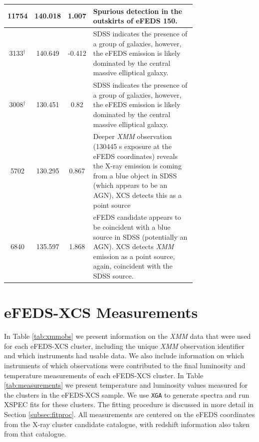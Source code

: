 \documentclass[fleqn,usenatbib]{mnras}
\begin{document}
\begin{table}
\begin{center}
\begin{tabular}{ccc|p{0.75\linewidth}}
\hline
11754 & 140.018 & 1.007 & Spurious detection in the outskirts of eFEDS 150. \\ 
\hline
3133$^\dagger$ & 140.649 & -0.412 & SDSS indicates the presence of a group of galaxies, however, the eFEDS emission is likely dominated by the central massive elliptical galaxy. \\ 
\hline
3008$^\dagger$ & 130.451 & 0.82 & SDSS indicates the presence of a group of galaxies, however, the eFEDS emission is likely dominated by the central massive elliptical galaxy. \\ 
\hline
5702 & 130.295 & 0.867 & Deeper {\em XMM} observation (130445 s exposure at the eFEDS coordinates) reveals the X-ray emission is coming from a blue object in SDSS (which appears to be an AGN), XCS detects this as a point source  \\ 
\hline
6840 & 135.597 & 1.868 & eFEDS candidate appears to be coincident with a blue source in SDSS (potentially an AGN). XCS detects {\em XMM} emission as a point source, again, coincident with the SDSS source. \\ 
\hline
\end{tabular}
\end{center}
\end{table}

\section{\lowercase{e}FEDS-XCS Measurements}
\label{app:measurements}
In Table \ref{tab:xmmobs} we present information on the {\em XMM} data that were used for each eFEDS-XCS cluster, including the unique {\em XMM} observation identifier and which instruments had usable data. We also include information on which instruments of which observations were contributed to the final luminosity and temperature measurements of each eFEDS-XCS cluster. 
In Table \ref{tab:measurements} we present temperature and luminosity values measured for the clusters in the eFEDS-XCS sample. We use \texttt{XGA} to generate spectra and run XSPEC fits for these clusters. The fitting procedure is discussed in more detail in Section \ref{subsec:fitproc}. All measurements are centered on the eFEDS coordinates from the X-ray cluster candidate catalogue, with redshift information also taken from that catalogue.
\end{document}
